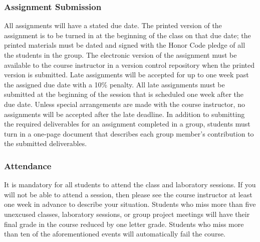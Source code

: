 \subsubsection*{Assignment Submission}

All assignments will have a stated due date. The printed version of the assignment is to be turned in at the beginning
of the class on that due date; the printed materials must be dated and signed with the Honor Code pledge of all the
students in the group.  The electronic version of the assignment must be available to the course instructor in a version
control repository when the printed version is submitted. Late assignments will be accepted for up to one week past the
assigned due date with a 10\% penalty. All late assignments must be submitted at the beginning of the session that is
scheduled one week after the due date. Unless special arrangements are made with the course instructor, no assignments
will be accepted after the late deadline. In addition to submitting the required deliverables for an assignment
completed in a group, students must turn in a one-page document that describes each group member's contribution to the
submitted deliverables.  

\subsubsection*{Attendance}

It is mandatory for all students to attend the class and laboratory sessions. If you will not be able to attend a
session, then please see the course instructor at least one week in advance to describe your situation.  Students who
miss more than five unexcused classes, laboratory sessions, or group project meetings will have their final grade in the
course reduced by one letter grade. Students who miss more than ten of the aforementioned events will automatically fail
the course.

% 
% 

